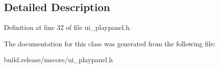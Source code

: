 \subsection{Detailed Description}


Definition at line 32 of file ui\+\_\+playpanel.\+h.



The documentation for this class was generated from the following file\+:\begin{DoxyCompactItemize}
\item 
build.\+release/mscore/ui\+\_\+playpanel.\+h\end{DoxyCompactItemize}
